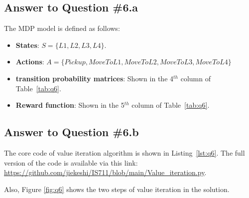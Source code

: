 \documentclass[conference]{styles/acmsiggraph}
\begin{document}
\subsection{Answer to Question \#6.a}
The MDP model is defined as follows:
\begin{itemize}[leftmargin=*]
	\setlength{\itemsep}{0pt}
	\setlength{\parsep}{0pt}
	\setlength{\parskip}{0pt}
	\item \textbf{States}: $S = \{L1, L2, L3, L4\}$.
	\item \textbf{Actions}: $A = \{Pickup, MoveToL1, MoveToL2, MoveToL3, MoveToL4\}$
	\item \textbf{transition probability matrices}: Shown in the 4$^{th}$ column of Table~\ref{tab:q6}.
	\item \textbf{Reward function}: Shown in the 5$^{th}$ column of Table~\ref{tab:q6}.
\end{itemize}


\subsection{Answer to Question \#6.b}
The core code of value iteration algorithm is shown in Listing~\ref{lst:q6}. The full version of the code is available via this link: \url{https://github.com/jiekeshi/IS711/blob/main/Value_iteration.py}.

Also, Figure \ref{fig:q6} shows the two steps of value iteration in the solution.
\end{document}
